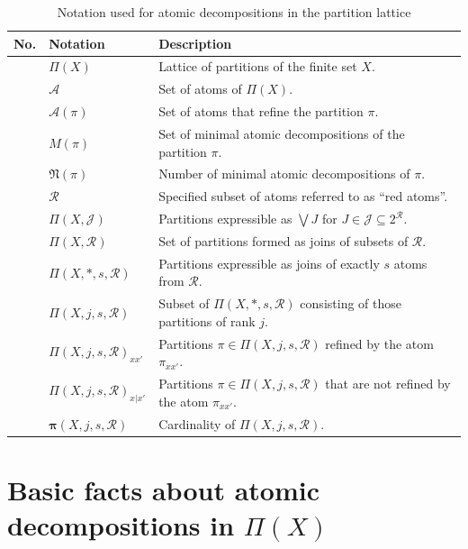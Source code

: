 \documentclass[12pt]{extarticle}
\newcounter{rownumber}
\newcommand{\rownumber}{\stepcounter{rownumber}\arabic{rownumber}}
\begin{document}
\begin{table}[h!]
	\centering
	\renewcommand{\arraystretch}{1.3}
	\begin{tabularx}{\textwidth}{|c|>{\raggedright\arraybackslash}p{4cm}|>{\raggedright\arraybackslash}X|}
		\hline
		\textbf{No.} & \textbf{Notation} & \textbf{Description} \\
		\hline
			\rownumber & \( \Pi(X) \) & Lattice of partitions of the finite set $X$. \\
		\rownumber & \( \mathcal{A} \) & Set of atoms of \(\Pi(X)\). \\
		\rownumber & \( \mathcal{A}(\pi) \) & Set of atoms that refine the partition \( \pi \). \\
			\rownumber & \( M(\pi) \) & Set of minimal atomic decompositions of the partition $\pi$. \\
		\rownumber & \( \mathfrak{N}(\pi) \) & Number of minimal atomic decompositions of \(\pi\). \\
			\rownumber & \( \mathcal{R} \) & Specified subset of atoms referred to as ``red atoms''. \\
		\rownumber & \( \Pi(X,\mathcal{J}) \) & Partitions expressible as \( \bigvee J \) for \( J \in \mathcal{J} \subseteq 2^{\mathcal{R}} \). \\
		\rownumber & \( \Pi(X,\mathcal{R}) \) & Set of partitions formed as joins of subsets of \(\mathcal{R}\). \\
		\rownumber & \( \Pi(X,*,s,\mathcal{R}) \) & Partitions expressible as joins of exactly \( s \) atoms from \( \mathcal{R} \). \\
		\rownumber & \( \Pi(X,j,s,\mathcal{R}) \) & Subset of \( \Pi(X,*,s,\mathcal{R}) \) consisting of those partitions of rank \( j \). \\
		\rownumber & \( \Pi(X,j,s,\mathcal{R})_{xx'} \) & Partitions \( \pi \in \Pi(X,j,s,\mathcal{R}) \) refined by the atom \( \pi_{xx'} \). \\
		\rownumber & \( \Pi(X,j,s,\mathcal{R})_{x|x'} \) & Partitions \( \pi \in \Pi(X,j,s,\mathcal{R}) \) that are not refined by the atom \( \pi_{xx'} \). \\
		\rownumber & \( \boldsymbol{\pi}(X,j,s,\mathcal{R}) \) & Cardinality of \( \Pi(X,j,s,\mathcal{R}) \). \\
		\hline
	\end{tabularx}
	\caption{Notation used for atomic decompositions in the partition lattice}
	\label{tab:notation}
\end{table}
	
	
	\section{Basic facts about atomic decompositions in $\Pi(X)$}
	
\end{document}
